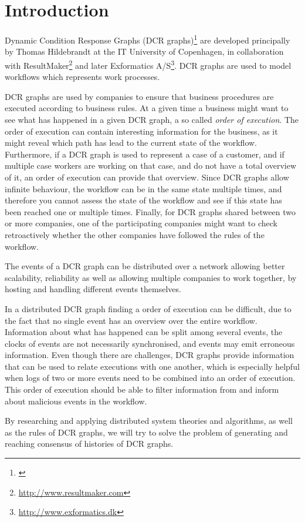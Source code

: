 \chapter{Introduction}
	Dynamic Condition Response Graphs (DCR graphs)\footnote{\cite{hildebrandt2011declarative}} are developed principally by Thomas Hildebrandt at the IT University of Copenhagen, in collaboration with ResultMaker\footnote{\url{http://www.resultmaker.com}} and later Exformatics A/S\footnote{\url{http://www.exformatics.dk}}. DCR graphs are used to model workflows which represents work processes.
	
	\newpar DCR graphs are used by companies to ensure that business procedures are executed according to business rules. At a given time a business might want to see what has happened in a given DCR graph, a so called \textit{order of execution}. The order of execution can contain interesting information for the business, as it might reveal which path has lead to the current state of the workflow. Furthermore, if a DCR graph is used to represent a case of a customer, and if multiple case workers are working on that case, and do not have a total overview of it, an order of execution can provide that overview. Since DCR graphs allow infinite behaviour, the workflow can be in the same state multiple times, and therefore you cannot assess the state of the workflow and see if this state has been reached one or multiple times. Finally, for DCR graphs shared between two or more companies, one of the participating companies might want to check retroactively whether the other companies have followed the rules of the workflow.
	
	\newpar The events of a DCR graph can be distributed over a network allowing better scalability, reliability as well as allowing multiple companies to work together, by hosting and handling different events themselves.
	
	\newpar In a distributed DCR graph finding a order of execution can be difficult, due to the fact that no single event has an overview over the entire workflow. Information about what has happened can be split among several events, the clocks of events are not necessarily synchronised, and events may emit erroneous information. Even though there are challenges, DCR graphs provide information that can be used to relate executions with one another, which is especially helpful when logs of two or more events need to be combined into an order of execution. This order of execution should be able to filter information from and inform about malicious events in the workflow.

	
	\newpar By researching and applying distributed system theories and algorithms, as well as the rules of DCR graphs, we will try to solve the problem of generating and reaching consensus of histories of DCR graphs. 